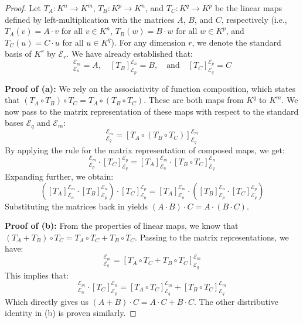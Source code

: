 \begin{proof}
Let $T_A: K^n \to K^m$, $T_B: K^p \to K^n$, and $T_C: K^q \to K^p$ be the linear maps defined by left-multiplication with the matrices $A$, $B$, and $C$, respectively (i.e., $T_A(v) = A \cdot v$ for all $v \in K^n$, $T_B(w) = B \cdot w$ for all $w \in K^p$, and $T_C(u) = C \cdot u$ for all $u \in K^q$). For any dimension $r$, we denote the standard basis of $K^r$ by $\mathcal{E}_r$. We have already established that:
\begin{equation*}
    [T_A]_{\mathcal{E}_n}^{\mathcal{E}_m} = A, \quad [T_B]_{\mathcal{E}_p}^{\mathcal{E}_n} = B, \quad \text{and} \quad [T_C]_{\mathcal{E}_q}^{\mathcal{E}_p} = C
\end{equation*}

\textbf{Proof of (a):} We rely on the associativity of function composition, which states that $(T_A \circ T_B) \circ T_C = T_A \circ (T_B \circ T_C)$. These are both maps from $K^q$ to $K^m$. We now pass to the matrix representation of these maps with respect to the standard bases $\mathcal{E}_q$ and $\mathcal{E}_m$:
\begin{equation*}
    [(T_A \circ T_B) \circ T_C]_{\mathcal{E}_q}^{\mathcal{E}_m} = [T_A \circ (T_B \circ T_C)]_{\mathcal{E}_q}^{\mathcal{E}_m}
\end{equation*}
By applying the rule for the matrix representation of composed maps, we get:
\begin{equation*}
    [T_A \circ T_B]_{\mathcal{E}_p}^{\mathcal{E}_m} \cdot [T_C]_{\mathcal{E}_q}^{\mathcal{E}_p} = [T_A]_{\mathcal{E}_n}^{\mathcal{E}_m} \cdot [T_B \circ T_C]_{\mathcal{E}_q}^{\mathcal{E}_n}
\end{equation*}
Expanding further, we obtain:
\begin{equation*}
    \left([T_A]_{\mathcal{E}_n}^{\mathcal{E}_m} \cdot [T_B]_{\mathcal{E}_p}^{\mathcal{E}_n}\right) \cdot [T_C]_{\mathcal{E}_q}^{\mathcal{E}_p} = [T_A]_{\mathcal{E}_n}^{\mathcal{E}_m} \cdot \left([T_B]_{\mathcal{E}_p}^{\mathcal{E}_n} \cdot [T_C]_{\mathcal{E}_q}^{\mathcal{E}_p}\right)
\end{equation*}
Substituting the matrices back in yields $(A \cdot B) \cdot C = A \cdot (B \cdot C)$.

\textbf{Proof of (b):} From the properties of linear maps, we know that $(T_A + T_B) \circ T_C = T_A \circ T_C + T_B \circ T_C$. Passing to the matrix representations, we have:
\begin{equation*}
    [(T_A + T_B) \circ T_C]_{\mathcal{E}_q}^{\mathcal{E}_m} = [T_A \circ T_C + T_B \circ T_C]_{\mathcal{E}_q}^{\mathcal{E}_m}
\end{equation*}
This implies that:
\begin{equation*}
    [T_A + T_B]_{\mathcal{E}_n}^{\mathcal{E}_m} \cdot [T_C]_{\mathcal{E}_q}^{\mathcal{E}_n} = [T_A \circ T_C]_{\mathcal{E}_q}^{\mathcal{E}_m} + [T_B \circ T_C]_{\mathcal{E}_q}^{\mathcal{E}_m}
\end{equation*}
Which directly gives us $(A + B) \cdot C = A \cdot C + B \cdot C$. The other distributive identity in (b) is proven similarly.


\end{proof}
